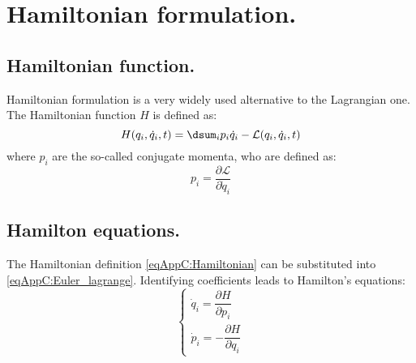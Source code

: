 \section{Hamiltonian formulation.}
%
%
	\subsection{Hamiltonian function.}
	\indent Hamiltonian formulation is a very widely used alternative to the Lagrangian one. The Hamiltonian function $H$ is defined as:
	\begin{equation}
	\label{eqAppC:Hamiltonian} H(q_i, \dot{q}_i,t) = \dsum_i p_i \dot{q}_i  - \mathcal{L}(q_i, \dot{q}_i, t)
	\end{equation}
	\noindent where $p_i$ are the so-called conjugate momenta, who are defined as:
	\begin{equation}
	\label{eqAppC:conj_mom}
	p_i = \dfrac{\partial \mathcal{L}}{\partial \dot{q}_i}
	\end{equation}
	\subsection{Hamilton equations.}
	\indent The Hamiltonian definition \eqref{eqAppC:Hamiltonian} can be substituted into \eqref{eqAppC:Euler_lagrange}. Identifying coefficients leads to Hamilton's equations:
	\begin{equation}
	\left\{ \begin{array}{ccc}
	\dot{q}_i = \dfrac{\partial H }{\partial p_i} \\[1.2em]
	\dot{p}_i = -\dfrac{\partial H}{\partial q_i}
	\end{array}\right.
	\label{eqAppC:Ham_eqs}
	\end{equation}
